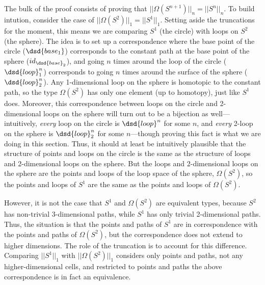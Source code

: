 The bulk of the proof consists of proving that $||\Omega(S^{n+1})||_n =
||S^{n}||_n$.  To build intution, consider the case of
$||\Omega(S^2)||_1 = ||S^1||_1$.  Setting aside the truncations for the
moment, this means we are comparing $S^1$ (the circle) with loops on
$S^2$ (the sphere).  The idea is to set up a correspondence where the
base point of the circle ($\dsd{base_1}$) corresponds to the constant
path at the base point of the sphere ($id_{\dsd{base}_2}$), and going
$n$ times around the loop of the circle ($\dsd{loop}_1^n$) corresponds to
going $n$ times around the surface of the sphere ($\dsd{loop}_2^n$).  Any
1-dimensional loop on the sphere is homotopic to the constant path, so
the type $\Omega(S^2)$ has only one element (up to homotopy), just like
$S^1$ does.  Moreover, this correspondence between loops on the circle
and 2-dimensional loops on the sphere will turn out to be a bijection as
well---intuitively, \emph{every} loop on the circle is $\dsd{loop}^n$
for some $n$, and \emph{every} 2-loop on the sphere is $\dsd{loop}_2^n$
for some $n$---though proving this fact is what we are doing in this
section.  Thus, it should at least be intuitively plausible that the
structure of points and loops on the circle is the same as the structure
of loops and 2-dimensional loops on the sphere.  But the loops and
2-dimensional loops on the sphere are the points and loops of the loop
space of the sphere, $\Omega(S^2)$, so the points and loops of $S^1$ are
the same as the points and loops of $\Omega(S^2)$.

However, it is not the case that $S^1$ and $\Omega(S^2)$ are equivalent
types, because $S^2$ has non-trivial 3-dimensional paths, while $S^1$
has only trivial 2-dimensional paths.  Thus, the situation is that the
points and paths of $S^1$ are in correspondence with the points and
paths of $\Omega(S^2)$, but the correspondence does not extend to higher
dimensions.  The role of the truncation is to account for this
difference.  Comparing $||S^1||_1$ with $||\Omega(S^2)||_1$ considers
only points and paths, not any higher-dimensional cells, and restricted
to points and paths the above correspondence is in fact an equivalence.

